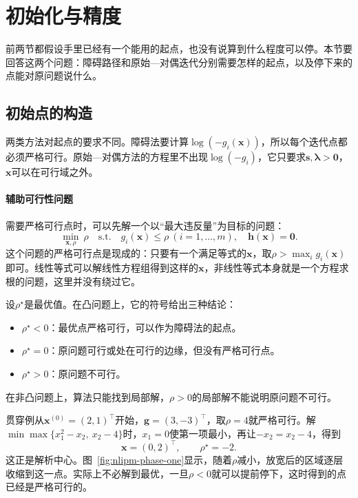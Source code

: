 \section{初始化与精度}
\label{sec:nlipm-init-accuracy}

前两节都假设手里已经有一个能用的起点，也没有说算到什么程度可以停。本节要回答这两个问题：障碍路径和原始—对偶迭代分别需要怎样的起点，以及停下来的点能对原问题说什么。

\subsection{初始点的构造}
\label{sec:nlipm-initial-point}

两类方法对起点的要求不同。障碍法要计算$\log(-g_i(\bm{x}))$，所以每个迭代点都必须严格可行。原始—对偶方法的方程里不出现$\log(-g_i)$，它只要求$\bm{s},\bm{\lambda}>\bm{0}$，$\bm{x}$可以在可行域之外。

\paragraph{辅助可行性问题}
需要严格可行点时，可以先解一个以“最大违反量”为目标的问题：
\begin{equation}
 \min_{\bm{x},\rho}\ \rho\quad\text{s.t.}\quad g_i(\bm{x})\leq\rho\ (i=1,\ldots,m),\quad\bm{h}(\bm{x})=\bm{0}.
 \label{eq:nlipm-phase-one}
\end{equation}
这个问题的严格可行点是现成的：只要有一个满足等式的$\bm{x}$，取$\rho>\max_ig_i(\bm{x})$即可。线性等式可以解线性方程组得到这样的$\bm{x}$，非线性等式本身就是一个方程求根的问题，这里并没有绕过它。

设$\rho^\star$是最优值。在凸问题上，它的符号给出三种结论：

\begin{itemize}
 \item $\rho^\star<0$：最优点严格可行，可以作为障碍法的起点。
 \item $\rho^\star=0$：原问题可行或处在可行的边缘，但没有严格可行点。
 \item $\rho^\star>0$：原问题不可行。
\end{itemize}

在非凸问题上，算法只能找到局部解，$\rho>0$的局部解不能说明原问题不可行。

贯穿例从$\bm{x}^{(0)}=(2,1)^\top$开始，$\bm{g}=(3,-3)^\top$，取$\rho=4$就严格可行。解$\min\max\{x_1^2-x_2,\ x_2-4\}$时，$x_1=0$使第一项最小，再让$-x_2=x_2-4$，得到
\[
 \bm{x}=(0,2)^\top,\qquad\rho^\star=-2.
\]
这正是解析中心。图~\ref{fig:nlipm-phase-one}显示，随着$\rho$减小，放宽后的区域逐层收缩到这一点。实际上不必解到最优，一旦$\rho<0$就可以提前停下，这时得到的点已经是严格可行的。

